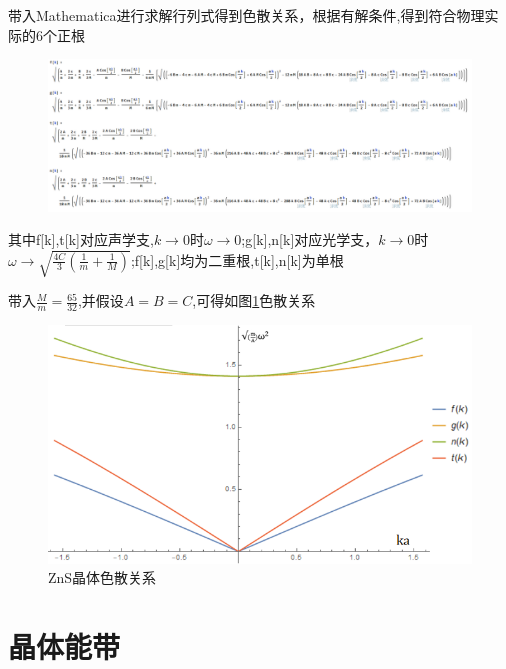 \documentclass{article}
\begin{document}
带入Mathematica进行求解行列式得到色散关系，根据有解条件,得到符合物理实际的6个正根
\begin{figure}[!h]
	\centering
	\includegraphics[scale=0.53]{w}
\end{figure}
其中f[k],t[k]对应声学支,$ k\rightarrow0 $时$ \omega\rightarrow0 $;g[k],n[k]对应光学支，$ k\rightarrow0 $时$ \omega\rightarrow\sqrt{\frac{4C}{3}(\frac{1}{m}+\frac{1}{M})} $;f[k],g[k]均为二重根,t[k],n[k]为单根


带入$ \frac{M}{m}=\frac{65}{32} $,并假设$ A=B=C $,可得如图\ref{fig:6}色散关系
	\begin{figure}[!h]
	\centering
	\includegraphics[scale=1]{vib}
	\caption{\heiti{}ZnS晶体色散关系}
	\label{fig:6}%
\end{figure}

\section{晶体能带}
\end{document}
